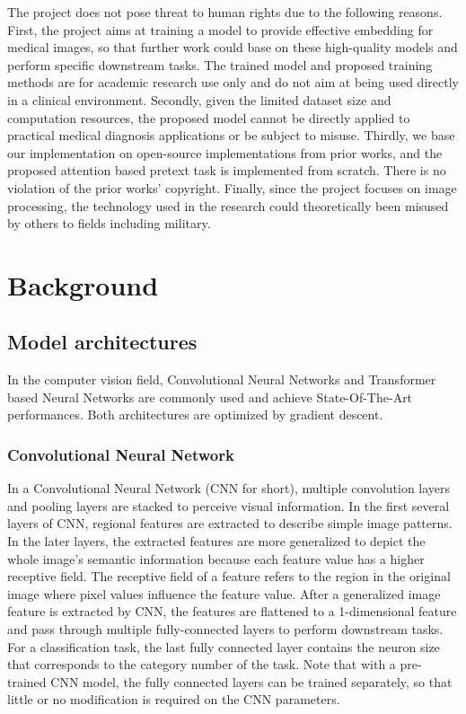 \documentclass[12pt,twoside]{report}
\begin{document}
The project does not pose threat to human rights due to the following reasons. First, the project aims at training a model to provide effective embedding for medical images, so that further work could base on these high-quality models and perform specific downstream tasks. The trained model and proposed training methods are for academic research use only and do not aim at being used directly in a clinical environment. Secondly, given the limited dataset size and computation resources, the proposed model cannot be directly applied to practical medical diagnosis applications or be subject to misuse. Thirdly, we base our implementation on open-source implementations from prior works, and the proposed attention based pretext task is implemented from scratch. There is no violation of the prior works' copyright. Finally, since the project focuses on image processing, the technology used in the research could theoretically been misused by others to fields including military. 




\chapter{Background}

\section{Model architectures}
In the computer vision field, Convolutional Neural Networks and Transformer based Neural Networks are commonly used and achieve State-Of-The-Art performances. Both architectures are optimized by gradient descent.

\subsection{Convolutional Neural Network}
In a Convolutional Neural Network (CNN for short), multiple convolution layers and pooling layers are stacked to perceive visual information. In the first several layers of CNN, regional features are extracted to describe simple image patterns. In the later layers, the extracted features are more generalized to depict the whole image's semantic information because each feature value has a higher receptive field. The receptive field of a feature refers to the region in the original image where pixel values influence the feature value. After a generalized image feature is extracted by CNN, the features are flattened to a 1-dimensional feature and pass through multiple fully-connected layers to perform downstream tasks. For a classification task, the last fully connected layer contains the neuron size that corresponds to the category number of the task. Note that with a pre-trained CNN model, the fully connected layers can be trained separately, so that little or no modification is required on the CNN parameters. \\
\end{document}
